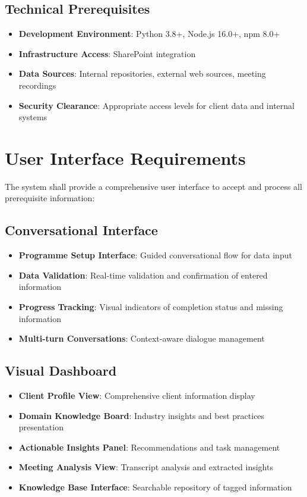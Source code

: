\documentclass{article}
\begin{document}
\subsection{Technical Prerequisites}
\begin{itemize}
    \item \textbf{Development Environment}: Python 3.8+, Node.js 16.0+, npm 8.0+
    \item \textbf{Infrastructure Access}: SharePoint integration
    \item \textbf{Data Sources}: Internal repositories, external web sources, meeting recordings
    \item \textbf{Security Clearance}: Appropriate access levels for client data and internal systems
\end{itemize}

\section{User Interface Requirements}
The system shall provide a comprehensive user interface to accept and process all prerequisite information:

\subsection{Conversational Interface}
\begin{itemize}
    \item \textbf{Programme Setup Interface}: Guided conversational flow for data input
    \item \textbf{Data Validation}: Real-time validation and confirmation of entered information
    \item \textbf{Progress Tracking}: Visual indicators of completion status and missing information
    \item \textbf{Multi-turn Conversations}: Context-aware dialogue management
\end{itemize}

\subsection{Visual Dashboard}
\begin{itemize}
    \item \textbf{Client Profile View}: Comprehensive client information display
    \item \textbf{Domain Knowledge Board}: Industry insights and best practices presentation
    \item \textbf{Actionable Insights Panel}: Recommendations and task management
    \item \textbf{Meeting Analysis View}: Transcript analysis and extracted insights
    \item \textbf{Knowledge Base Interface}: Searchable repository of tagged information
\end{itemize}
\end{document}

